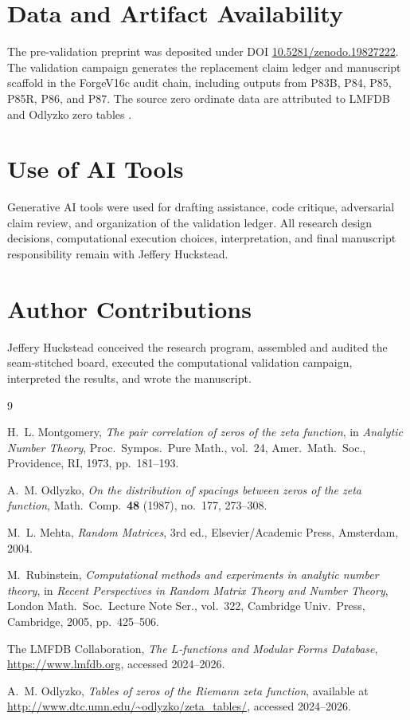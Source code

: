 \documentclass[11pt]{article}
\newcommand{\priorpreprintdoi}{10.5281/zenodo.19827222}
\begin{document}
\section*{Data and Artifact Availability}

The pre-validation preprint was deposited under DOI
\href{https://doi.org/\priorpreprintdoi}{\priorpreprintdoi}. The validation campaign generates the replacement claim ledger and manuscript scaffold in the ForgeV16c audit chain, including outputs from P83B, P84, P85, P85R, P86, and P87. The source zero ordinate data are attributed to LMFDB and Odlyzko zero tables \cite{lmfdb,odlyzko_tables}.

\section*{Use of AI Tools}

Generative AI tools were used for drafting assistance, code critique, adversarial claim review, and organization of the validation ledger. All research design decisions, computational execution choices, interpretation, and final manuscript responsibility remain with Jeffery Huckstead.

\section*{Author Contributions}

Jeffery Huckstead conceived the research program, assembled and audited the seam-stitched board, executed the computational validation campaign, interpreted the results, and wrote the manuscript.



\begin{thebibliography}{9}

H.~L. Montgomery,
\emph{The pair correlation of zeros of the zeta function},
in \emph{Analytic Number Theory}, Proc.\ Sympos.\ Pure Math., vol.~24,
Amer.\ Math.\ Soc., Providence, RI, 1973, pp.~181--193.

A.~M. Odlyzko,
\emph{On the distribution of spacings between zeros of the zeta function},
Math.\ Comp.\ \textbf{48} (1987), no.~177, 273--308.

M.~L. Mehta,
\emph{Random Matrices},
3rd ed., Elsevier/Academic Press, Amsterdam, 2004.

M.~Rubinstein,
\emph{Computational methods and experiments in analytic number theory},
in \emph{Recent Perspectives in Random Matrix Theory and Number Theory},
London Math.\ Soc.\ Lecture Note Ser., vol.~322,
Cambridge Univ.\ Press, Cambridge, 2005, pp.~425--506.

The LMFDB Collaboration,
\emph{The \(L\)-functions and Modular Forms Database},
\url{https://www.lmfdb.org}, accessed 2024--2026.

A.~M. Odlyzko,
\emph{Tables of zeros of the Riemann zeta function},
available at \url{http://www.dtc.umn.edu/~odlyzko/zeta_tables/},
accessed 2024--2026.

\end{thebibliography}
\end{document}
